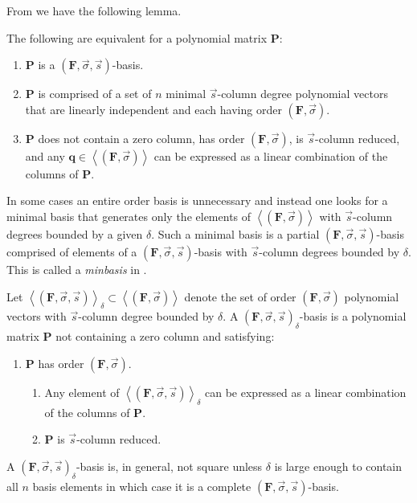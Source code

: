 From \citep{BL1997} we have the following lemma. 
\begin{lem}
\label{lem:orderBasisEquivalence}The following are equivalent for
a polynomial matrix \textbf{$\mathbf{P}$}: 
\begin{enumerate}
\item $\mathbf{P}$ is a $\left(\mathbf{F},\vec{\sigma},\vec{s}\right)$-basis. 
\item $\mathbf{P}$ is comprised of a set of $n$ minimal $\vec{s}$-column
degree polynomial vectors that are linearly independent and each having
order $\left(\mathbf{F},\vec{\sigma}\right)$. 
\item $\mathbf{P}$ does not contain a zero column, has order $\left(\mathbf{F},\vec{\sigma}\right)$,
is $\vec{s}$-column reduced, and any $\mathbf{q}\in\left\langle \left(\mathbf{F},\vec{\sigma}\right)\right\rangle $
can be expressed as a linear combination of the columns of $\mathbf{P}$.

\end{enumerate}
\end{lem}
In some cases an entire order basis is unnecessary and instead one
looks for a minimal basis that generates only the elements of $\left\langle \left(\mathbf{F},\vec{\sigma}\right)\right\rangle $
with $\vec{s}$-column degrees bounded by a given $\delta$. Such
a minimal basis is a partial $\left(\mathbf{F},\vec{\sigma},\vec{s}\right)$-basis
comprised of elements of a $\left(\mathbf{F},\vec{\sigma},\vec{s}\right)$-basis
with $\vec{s}$-column degrees bounded by $\delta$. This is called
a \emph{minbasis} in \citet{Storjohann:2006}. 
\begin{defn}
\label{def:genset} Let $\left\langle \left(\mathbf{F},\vec{\sigma},\vec{s}\right)\right\rangle _{\delta}\subset\left\langle \left(\mathbf{F},\vec{\sigma}\right)\right\rangle $
denote the set of order $\left(\mathbf{F},\vec{\sigma}\right)$ polynomial
vectors with $\vec{s}$-column degree bounded by $\delta$. A $\left(\mathbf{F},\vec{\sigma},\vec{s}\right)_{\delta}$-basis
is a polynomial matrix $\mathbf{P}$ not containing a zero column
and satisfying: \end{defn}
\begin{enumerate}
\item $\mathbf{P}$ has order $\left(\mathbf{F},\vec{\sigma}\right).$ 

\begin{enumerate}
\item Any element of $\left\langle \left(\mathbf{F},\vec{\sigma},\vec{s}\right)\right\rangle _{\delta}$
can be expressed as a linear combination of the columns of $\mathbf{P}$. 
\item $\mathbf{P}$ is $\vec{s}$-column reduced. 
\end{enumerate}
\end{enumerate}
\begin{comment}
As before, the linear combination here is in fact unique. 
\end{comment}
A $\left(\mathbf{F},\vec{\sigma},\vec{s}\right)_{\delta}$-basis is,
in general, not square unless $\delta$ is large enough to contain
all $n$ basis elements in which case it is a complete $\left(\mathbf{F},\vec{\sigma},\vec{s}\right)$-basis.


